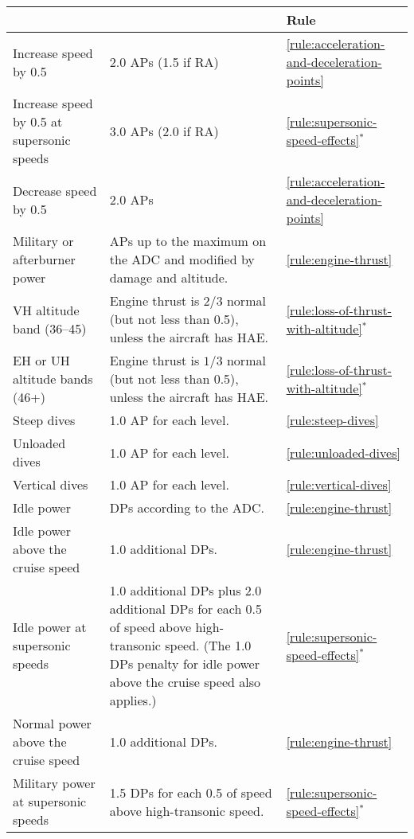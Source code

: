 {\begin{twocolumntable}[tp]


\begin{tabularx}{0.9\linewidth}{LLl}
\toprule
&&Rule\\
\midrule
\addlinespace
Increase speed by 0.5&2.0 APs (1.5 if RA)&\mbox{\ref{rule:acceleration-and-deceleration-points}}\\
Increase speed by 0.5 at supersonic speeds&3.0 APs (2.0 if RA)&\mbox{\ref{rule:supersonic-speed-effects}$^*$}\\
Decrease speed by 0.5&2.0 APs&\mbox{\ref{rule:acceleration-and-deceleration-points}}\\
\addlinespace
\midrule
\addlinespace
Military or afterburner power&APs up to the maximum on the ADC and modified by damage and altitude.&\mbox{\ref{rule:engine-thrust}}\\
VH altitude band (36--45)&Engine thrust is $2/3$ normal (but not less than 0.5), unless the aircraft has HAE.&\mbox{\ref{rule:loss-of-thrust-with-altitude}$^*$}\\
EH or UH altitude bands (46+)&Engine thrust is $1/3$ normal (but not less than 0.5), unless the aircraft has HAE.&\mbox{\ref{rule:loss-of-thrust-with-altitude}$^*$}\\
\addlinespace
Steep dives&1.0 AP for each level.&\mbox{\ref{rule:steep-dives}}\\
Unloaded dives&1.0 AP for each level.&\mbox{\ref{rule:unloaded-dives}}\\
Vertical dives&1.0 AP for each level.&\mbox{\ref{rule:vertical-dives}}\\
\addlinespace
\midrule
\addlinespace
Idle power&DPs according to the ADC.&\mbox{\ref{rule:engine-thrust}}\\
Idle power above the cruise speed&1.0 additional DPs.&\mbox{\ref{rule:engine-thrust}}\\
Idle power at supersonic speeds&1.0 additional DPs plus 2.0 additional DPs for each 0.5 of speed above high-transonic speed. (The 1.0 DPs penalty for idle power above the cruise speed also applies.)&\mbox{\ref{rule:supersonic-speed-effects}$^*$}\\
Normal power above the cruise speed&1.0 additional DPs.&\mbox{\ref{rule:engine-thrust}}\\
Military power at supersonic speeds&1.5 DPs for each 0.5 of speed above high-transonic speed.&\mbox{\ref{rule:supersonic-speed-effects}$^*$}\\

\end{tabularx}
\end{twocolumntable}}

